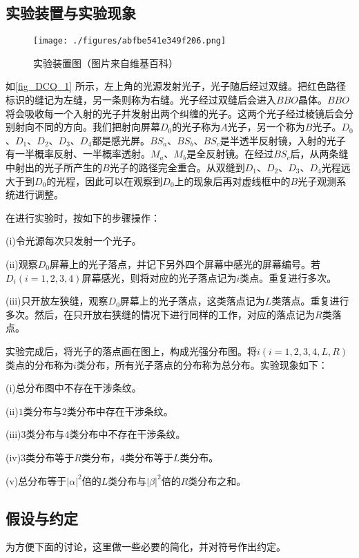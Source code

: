 

\subsection{实验装置与实验现象}
\begin{figure}[ht]
\centering
\texttt{[image: ./figures/abfbe541e349f206.png]}
\caption{实验装置图（图片来自维基百科）} \label{fig_DCQ_1}
\end{figure}

如\autoref{fig_DCQ_1} 所示，左上角的光源发射光子，光子随后经过双缝。把红色路径标识的缝记为左缝，另一条则称为右缝。光子经过双缝后会进入$BBO$晶体。$BBO$将会吸收每一个入射的光子并发射出两个纠缠的光子。这两个光子经过棱镜后会分别射向不同的方向。我们把射向屏幕$D_0$的光子称为$A$光子，另一个称为$B$光子。$D_0$、$D_1$、$D_2$、$D_3$、$D_4$都是感光屏。$BS_a$、$BS_b$、$BS_c$是半透半反射镜，入射的光子有一半概率反射、一半概率透射。$M_a$、$M_b$是全反射镜。在经过$BS_c$后，从两条缝中射出的光子所产生的$B$光子的路径完全重合。从双缝到$D_1$、$D_2$、$D_3$、$D_4$光程远大于到$D_0$的光程，因此可以在观察到$D_0$上的现象后再对虚线框中的$B$光子观测系统进行调整。

在进行实验时，按如下的步骤操作：

(i)令光源每次只发射一个光子。

(ii)观察$D_0$屏幕上的光子落点，并记下另外四个屏幕中感光的屏幕编号。若$D_i(i=1,2,3,4)$屏幕感光，则将对应的光子落点记为$i$类点。重复进行多次。

(iii)只开放左狭缝，观察$D_0$屏幕上的光子落点，这类落点记为$L$类落点。重复进行多次。然后，在只开放右狭缝的情况下进行同样的工作，对应的落点记为$R$类落点。

实验完成后，将光子的落点画在图上，构成光强分布图。将$i(i=1,2,3,4,L,R)$类点的分布称为$i$类分布，所有光子落点的分布称为总分布。实验现象如下：

(i)总分布图中不存在干涉条纹。

(ii)$1$类分布与$2$类分布中存在干涉条纹。

(iii)$3$类分布与$4$类分布中不存在干涉条纹。

(iv)$3$类分布等于$R$类分布，$4$类分布等于$L$类分布。

(v)总分布等于$|\alpha|^2$倍的$L$类分布与$|\beta|^2$倍的$R$类分布之和。

\subsection{假设与约定}
为方便下面的讨论，这里做一些必要的简化，并对符号作出约定。

